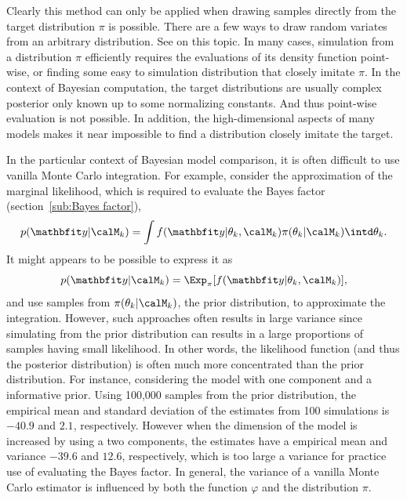 Clearly this method can only be applied when drawing samples directly from the
target distribution $\pi$ is possible. There are a few ways to draw random
variates from an arbitrary distribution. See \cite[][chap.~2]{Robert:2004tn}
on this topic. In many cases, simulation from a distribution $\pi$ efficiently
requires the evaluations of its density function point-wise, or finding some
easy to simulation distribution that closely imitate $\pi$. In the context of
Bayesian computation, the target distributions are usually complex posterior
only known up to some normalizing constants. And thus point-wise evaluation is
not possible. In addition, the high-dimensional aspects of many models makes
it near impossible to find a distribution closely imitate the target.

In the particular context of Bayesian model comparison, it is often difficult
to use vanilla Monte Carlo integration. For example, consider the
approximation of the marginal likelihood, which is required to evaluate the
Bayes factor (section~\ref{sub:Bayes factor}),
\begin{equation*}
  p(\data|\calM_k) =
  \int f(\data|\theta_k,\calM_k)\pi(\theta_k|\calM_k) \intd \theta_k.
\end{equation*}
It might appears to be possible to express it as
\begin{equation}
  p(\data|\calM_k) = \Exp_{\pi}[f(\data|\theta_k,\calM_k)],
  \label{eq:prior expectation}
\end{equation}
and use samples from $\pi(\theta_k|\calM_k)$, the prior distribution, to
approximate the integration. However, such approaches often results in large
variance since simulating from the prior distribution can results in a large
proportions of samples having small likelihood. In other words, the likelihood
function (and thus the posterior distribution) is often much more concentrated
than the prior distribution. For instance, considering the \pet model with one
component and a informative prior. Using 100,000 samples from the prior
distribution, the empirical mean and standard deviation of the estimates from
100 simulations is $-40.9$ and $2.1$, respectively. However when the dimension
of the model is increased by using a two components, the estimates have a
empirical mean and variance $-39.6$ and $12.6$, respectively, which is too
large a variance for practice use of evaluating the Bayes factor. In general,
the variance of a vanilla Monte Carlo estimator is influenced by both the
function $\varphi$ and the distribution $\pi$.

